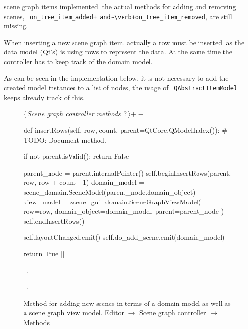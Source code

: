 \documentclass[%
    a4paper,    %
    justified,  %
    nobib,      %
    openany     %
]{tufte-book}
\makeatletter
\renewcommand{\label}[1]{\@tufte@label{##1}}%
\makeatother
\begin{document}
 scene
graph items implemented, the actual methods for adding and removing scenes,
~\verb=on_tree_item_added+ and~\verb+on_tree_item_removed=, are still missing.

When inserting a new scene graph item, actually a row must be inserted, as the
data model (Qt's) is using rows to represent the data. At the same time the
controller has to keep track of the domain model.

As can be seen in the implementation below, it is not necessary to add the
created model instances to a list of nodes, the usage of
~\verb=QAbstractItemModel= keeps already track of this.

\begin{figure}
\begin{flushleft} \small
\begin{minipage}{\linewidth}\label{scrap51}\raggedright\small
{} $\langle\,${\itshape Scene graph controller methods}\nobreak\ {\footnotesize {?}}$\,\rangle+\equiv$
\vspace{-1ex}
\begin{pythoncode}
def insertRows(self, row, count, parent=QtCore.QModelIndex()):
    # TODO: Document method.

    if not parent.isValid():
        return False

    parent_node = parent.internalPointer()
    self.beginInsertRows(parent, row, row + count - 1)
    domain_model  = scene_domain.SceneModel(parent_node.domain_object)
    view_model = scene_gui_domain.SceneGraphViewModel(
        row=row,
        domain_object=domain_model,
        parent=parent_node
    )
    self.endInsertRows()

    self.layoutChanged.emit()
    self.do_add_scene.emit(domain_model)

    return True
|\NWsep|
\end{pythoncode}
\vspace{1.5ex}
\footnotesize
\begin{list}{}{\setlength{\itemsep}{-\parsep}\setlength{\itemindent}{-\leftmargin}}
\item \NWtxtMacroDefBy\ .
\item \NWtxtMacroRefIn\ .

\item{}
\end{list}
\end{minipage}\vspace{4ex}
\end{flushleft}
\caption{Method for adding new scenes in terms of a domain model as well as a
  scene graph view model.
  \newline{}\newline{}Editor $\rightarrow$ Scene graph controller
  $\rightarrow$ Methods}
\label{editor:lst:scene-graph-controller:methods:insert-rows}
\end{figure}
\end{document}
